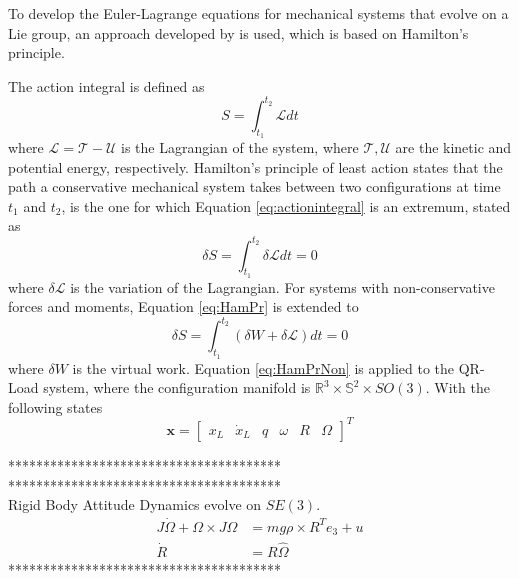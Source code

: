 
To develop the Euler-Lagrange equations for mechanical systems that evolve on a Lie group, an approach developed by \cite{Lee2008,Lee2005,Lee2009,Lee2011} is used, which is based on Hamilton's principle. 

The action integral is defined as
\begin{equation}\label{eq:actionintegral}
S=\int_{t_1}^{t_2}\mathcal{L}dt
\end{equation}
where $\mathcal{L}=\mathcal{T}-\mathcal{U} $ is the Lagrangian of the system, where $\mathcal{T},\mathcal{U}$ are the kinetic and potential energy, respectively. Hamilton's principle of least action states that the path a conservative mechanical system takes between two configurations at time $ t_1 $ and $ t_2 $, is the one for which Equation \ref{eq:actionintegral} is an extremum, stated as
\begin{equation}\label{eq:HamPr}
\delta S=\int_{t_1}^{t_2}\delta\mathcal{L}dt=0
\end{equation}
where $ \delta\mathcal{L} $ is the variation of the Lagrangian. For systems with non-conservative forces and moments, Equation \ref{eq:HamPr} is extended to
\begin{equation}\label{eq:HamPrNon}
\delta S=\int_{t_1}^{t_2}(\delta W+\delta\mathcal{L})dt=0
\end{equation}
where $ \delta W $ is the virtual work. Equation \ref{eq:HamPrNon} is applied to the QR-Load system, where the configuration manifold is $ \mathbb{R}^3\times \mathbb{S}^2\times SO(3) $. With the following states
\begin{equation}\label{key}
\textbf{x}= \begin{bmatrix}x_L& \dot{x}_L& q& \omega&R&\Omega
\end{bmatrix}^T
\end{equation}


***************************************\\

***************************************\\
Rigid Body Attitude Dynamics evolve on $ SE(3) $.
\begin{align}\label{eq:eomrigidbody}
J\dot{\Omega}+\Omega\times J\Omega &= mg\rho\times R^Te_3+u\\ 
\dot{R} &= R\hat{\Omega}
\end{align}
***************************************\\


